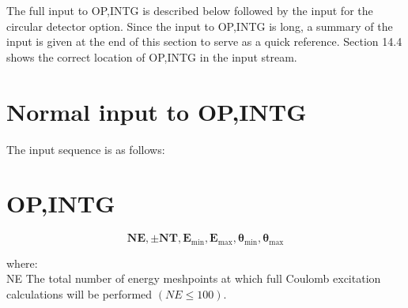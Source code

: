 \documentclass[10pt]{article}
\begin{document}
The full input to OP,INTG is described below followed by the input for the circular detector option. Since the input to OP,INTG is long, a summary of the input is given at the end of this section to serve as a quick reference. Section 14.4 shows the correct location of OP,INTG in the input stream.

\section*{Normal input to OP,INTG}
The input sequence is as follows:

\section*{OP,INTG}
$$
\mathbf{N E}, \pm \mathbf{N T}, \mathbf{E}_{\min }, \mathbf{E}_{\max }, \boldsymbol{\theta}_{\min }, \boldsymbol{\theta}_{\max }
$$

where:\\
NE The total number of energy meshpoints at which full Coulomb excitation calculations will be performed $(N E \leq 100)$.
\end{document}
